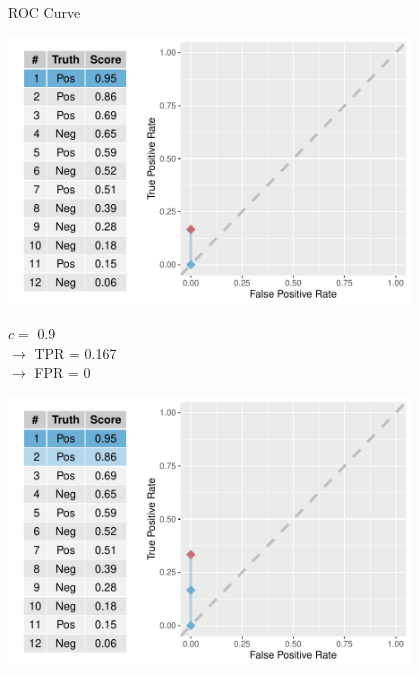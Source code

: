 \documentclass[11pt,compress,t,notes=noshow, xcolor=table]{beamer}
\newenvironment{knitrout}{}{} %
\begin{document}
\begin{vbframe}{ROC Curve}

\begin{knitrout}\scriptsize
{}\color{fgcolor}

{\centering \includegraphics[width=0.8\textwidth]{figure/eval_mclass_roc_sp_5} 

}



\end{knitrout}

$c =$ 0.9\\ 
$\rightarrow$ TPR = 0.167 \\
$\rightarrow$ FPR = 0


\framebreak

\begin{knitrout}\scriptsize
{}\color{fgcolor}

{\centering \includegraphics[width=0.8\textwidth]{figure/eval_mclass_roc_sp_6} 

}



\end{knitrout}


\end{vbframe}
\end{document}
